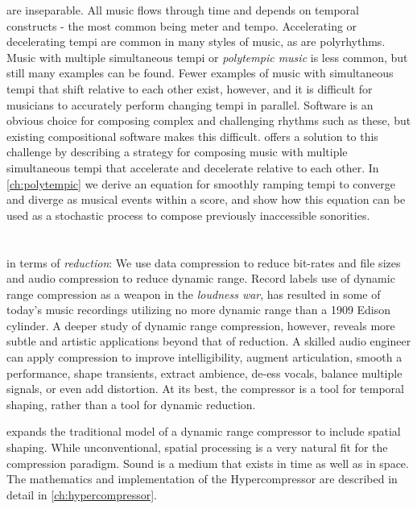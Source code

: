  are inseparable. All music flows through
time and depends on temporal constructs - the most common being meter
and tempo. Accelerating or decelerating tempi are common in many
styles of music, as are polyrhythms.  Music with multiple simultaneous
tempi or \textit{polytempic music} is less common, but still many
examples can be found. Fewer examples of music with simultaneous tempi
that shift relative to each other exist, however, and it is difficult
for musicians to accurately perform changing tempi in
parallel. Software is an obvious choice for composing complex and
challenging rhythms such as these, but existing compositional software
makes this difficult. \polytempic offers a solution to this challenge
by describing a strategy for composing music with multiple
simultaneous tempi that accelerate and decelerate relative to each
other. In \autoref{ch:polytempic} we derive an equation for smoothly
ramping tempi to converge and diverge as musical events within a
score, and show how this equation can be used as a stochastic process
to compose previously inaccessible sonorities.

\section{\thesis}
\label{sec:hypercompression-intro}
 in terms of
\emph{reduction}: We use data compression to reduce bit-rates and file
sizes and audio compression to reduce dynamic range. Record labels use
of dynamic range compression as a weapon in the \emph{loudness
  war}\cite{Deruty2014a}, has resulted in some of today's music
recordings utilizing no more dynamic range than a 1909 Edison
cylinder.\cite{Katz2007} A deeper study of dynamic range compression,
however, reveals more subtle and artistic applications beyond that of
reduction. A skilled audio engineer can apply compression to
improve intelligibility, augment articulation, smooth a performance,
shape transients, extract ambience, de-ess vocals, balance multiple
signals, or even add distortion.\cite{Case2007} At its best, the
compressor is a tool for temporal shaping, rather than a tool for
dynamic reduction.

\thesis expands the traditional model of a dynamic range compressor to
include spatial shaping. While unconventional, spatial processing is a
very natural fit for the compression paradigm. Sound is a medium that
exists in time as well as in space. The mathematics
and implementation of the Hypercompressor are described in detail in
\autoref{ch:hypercompressor}.

